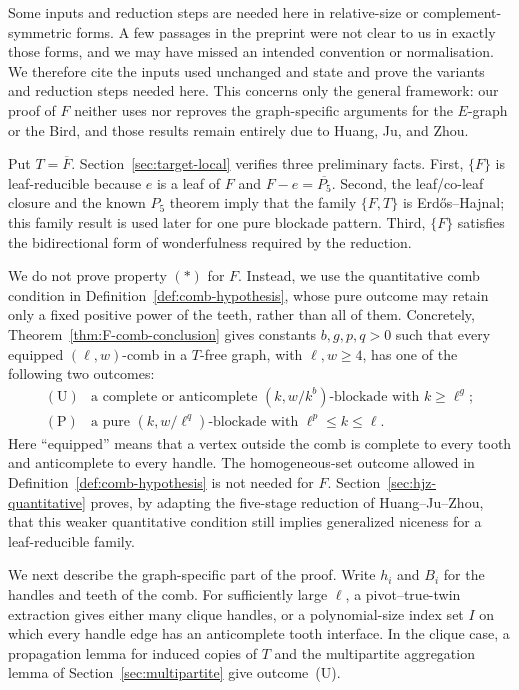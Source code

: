 \documentclass[11pt]{article}
\numberwithin{equation}{section}
\theoremstyle{plain}
\theoremstyle{definition}
\begin{document}
Some inputs and reduction steps are needed here in relative-size or
complement-symmetric forms.  A few passages in the preprint were not
clear to us in exactly those forms, and we may have missed an intended
convention or normalisation.  We therefore cite the inputs used
unchanged and state and prove the variants and reduction steps needed
here.  This concerns only the general framework: our proof of $F$
neither uses nor reproves the graph-specific arguments for the
$E$-graph or the Bird, and those results remain entirely due to Huang,
Ju, and Zhou.

Put $T=\overline F$.  Section~\ref{sec:target-local} verifies three
preliminary facts.  First, $\{F\}$ is leaf-reducible because $e$ is a
leaf of $F$ and $F-e=\overline{P_5}$.  Second, the leaf/co-leaf closure
and the known $P_5$ theorem imply that the family $\{F,T\}$ is
Erd\H{o}s--Hajnal; this family result is used later for one pure
blockade pattern.  Third, $\{F\}$ satisfies the bidirectional form of
wonderfulness required by the reduction.

We do not prove property $(*)$ for $F$.  Instead, we use the
quantitative comb condition in Definition~\ref{def:comb-hypothesis},
whose pure outcome may retain only a fixed positive power of the teeth,
rather than all of them.  Concretely,
Theorem~\ref{thm:F-comb-conclusion} gives constants $b,g,p,q>0$ such
that every equipped $(\ell,w)$-comb in a $T$-free graph, with
$\ell,w\geq4$, has one of the following two outcomes:
\[
\begin{array}{ll}
\mathrm{(U)} & \text{a complete or anticomplete $(k,w/k^b)$-blockade
                     with $k\geq\ell^g$};\\[2pt]
\mathrm{(P)} & \text{a pure $(k,w/\ell^q)$-blockade with
                     $\ell^p\leq k\leq\ell$}.
\end{array}
\]
Here ``equipped'' means that a vertex outside the comb is complete to
every tooth and anticomplete to every handle.  The homogeneous-set
outcome allowed in Definition~\ref{def:comb-hypothesis} is not needed
for $F$.  Section~\ref{sec:hjz-quantitative} proves, by adapting the
five-stage reduction of Huang--Ju--Zhou, that this weaker quantitative
condition still implies generalized niceness for a leaf-reducible
family.

We next describe the graph-specific part of the proof.  Write $h_i$ and
$B_i$ for the handles and teeth of the comb.  For sufficiently large
$\ell$, a pivot--true-twin extraction gives either many clique handles,
or a polynomial-size index set $I$ on which every handle edge has an
anticomplete tooth interface.  In the clique case, a propagation lemma
for induced copies of $T$ and the multipartite aggregation lemma of
Section~\ref{sec:multipartite} give outcome~(U).
\end{document}
